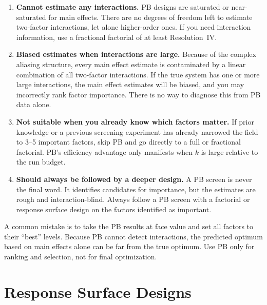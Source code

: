 \documentclass[11pt]{book}
\begin{document}
\begin{enumerate}
\item \textbf{Cannot estimate any interactions.} PB designs are saturated or
      near-saturated for main effects. There are no degrees of freedom left to
      estimate two-factor interactions, let alone higher-order ones. If you need
      interaction information, use a fractional factorial of at least Resolution~IV.

\item \textbf{Biased estimates when interactions are large.} Because of the
      complex aliasing structure, every main effect estimate is contaminated by a
      linear combination of all two-factor interactions. If the true system has
      one or more large interactions, the main effect estimates will be biased,
      and you may incorrectly rank factor importance. There is no way to diagnose
      this from PB data alone.

\item \textbf{Not suitable when you already know which factors matter.} If
      prior knowledge or a previous screening experiment has already narrowed the
      field to 3--5 important factors, skip PB and go directly to a full or
      fractional factorial. PB's efficiency advantage only manifests when $k$ is
      large relative to the run budget.

\item \textbf{Should always be followed by a deeper design.} A PB screen is
      never the final word. It identifies candidates for importance, but the
      estimates are rough and interaction-blind. Always follow a PB screen with a
      factorial or response surface design on the factors identified as important.
\end{enumerate}

\begin{warning}
A common mistake is to take the PB results at face value and set all factors to
their ``best'' levels. Because PB cannot detect interactions, the predicted
optimum based on main effects alone can be far from the true optimum. Use PB
only for ranking and selection, not for final optimization.
\end{warning}

\chapter{Response Surface Designs}
\end{document}
